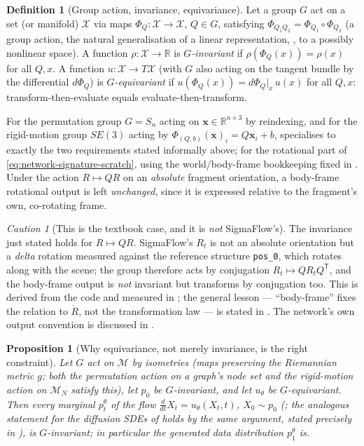 \documentclass[11pt,a4paper]{report}
\newtheorem{proposition}[proposition]{Proposition}
\theoremstyle{definition}
\newtheorem{definition}[definition]{Definition}
\theoremstyle{remark}
\newtheorem{caution}[caution]{Caution}
\newcommand{\RR}{\mathbb R}
\begin{document}
\begin{definition}[Group action, invariance, equivariance]
\label{def:equivariance-full}
Let a group $G$ act on a set (or manifold) $\mathcal X$ via maps
$\Phi_Q:\mathcal X\to\mathcal X$, $Q\in G$, satisfying
$\Phi_{Q_1Q_2}=\Phi_{Q_1}\circ\Phi_{Q_2}$ (a group action, the natural
generalisation of a linear representation, ,
to a possibly nonlinear space). A function $\rho:\mathcal X\to\RR$ is
\emph{$G$-invariant} if $\rho(\Phi_Q(x))=\rho(x)$ for all $Q,x$. A function
$u:\mathcal X\to T\mathcal X$ (with $G$ also acting on the tangent bundle by
the differential $d\Phi_Q$) is \emph{$G$-equivariant} if
$u(\Phi_Q(x)) = d\Phi_Q|_x\,u(x)$ for all $Q,x$: transform-then-evaluate
equals evaluate-then-transform.
\end{definition}

For the permutation group $G=S_n$ acting on $\mathbf x\in\RR^{n\times3}$ by
reindexing, and for the rigid-motion group $SE(3)$ acting by
$\Phi_{(Q,b)}(\mathbf x)_i = Q\mathbf x_i+b$, 
specialises to exactly the two requirements stated informally above; for
the rotational part of \eqref{eq:network-signature-scratch}, using the
world/body-frame bookkeeping fixed in . Under
the action $R\mapsto QR$ on an \emph{absolute} fragment orientation, a
body-frame rotational output is left \emph{unchanged}, since it is expressed
relative to the fragment's own, co-rotating frame.

\begin{caution}[This is the textbook case, and it is \emph{not} SigmaFlow's]
\label{caution:absolute-vs-delta}
The invariance just stated holds for $R\mapsto QR$. SigmaFlow's $R_t$ is not
an absolute orientation but a \emph{delta} rotation measured against the
reference structure \texttt{pos\_0}, which rotates along with the scene; the
group therefore acts by conjugation $R_t\mapsto QR_tQ^{\mathsf T}$, and the
body-frame output is \emph{not} invariant but transforms by conjugation too.
This is derived from the code and measured in
; the general lesson --- ``body-frame'' fixes the
relation to $\dot R$, not the transformation law --- is stated in
. The network's own output convention is
discussed in .
\end{caution}

\begin{proposition}[Why equivariance, not merely invariance, is the right constraint]
\label{prop:equivariant-invariant-scratch}
Let $G$ act on $\mathcal M$ by isometries (maps preserving the Riemannian
metric $g$; both the permutation action on a graph's node set and the
rigid-motion action on $\mathcal M_N$ satisfy this), let $p_0$ be
$G$-invariant, and let $u_\theta$ be $G$-equivariant. Then every marginal
$p_t^\theta$ of the flow $\tfrac{d}{dt}X_t=u_\theta(X_t,t)$, $X_0\sim p_0$
(; the analogous statement for the diffusion SDEs
of  holds by the same argument,
stated precisely in ), is $G$-invariant; in
particular the generated data distribution $p_1^\theta$ is.
\end{proposition}
\end{document}
